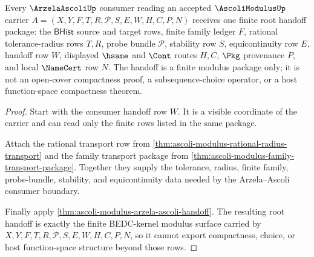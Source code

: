 \begin{theorem}
\label{thm:ascoli-modulus-arzela-root-handoff-package}
Every $\ArzelaAscoliUp$ consumer reading an accepted $\AscoliModulusUp$ carrier $A=(X,Y,F,T,R,\mathcal{P},S,E,W,H,C,P,N)$ receives one finite root handoff package: the $\mathsf{BHist}$ source and target rows, finite family ledger $F$, rational tolerance-radius rows $T,R$, probe bundle $\mathcal{P}$, stability row $S$, equicontinuity row $E$, handoff row $W$, displayed $\hsame$ and $\Cont$ routes $H,C$, $\Pkg$ provenance $P$, and local $\NameCert$ row $N$. The handoff is a finite modulus package only; it is not an open-cover compactness proof, a subsequence-choice operator, or a host function-space compactness theorem.
\end{theorem}
\begin{proof}
Start with the consumer handoff row $W$. It is a visible coordinate of the carrier and can read only the finite rows listed in the same package.

Attach the rational transport row from \autoref{thm:ascoli-modulus-rational-radius-transport} and the family transport package from \autoref{thm:ascoli-modulus-family-transport-package}. Together they supply the tolerance, radius, finite family, probe-bundle, stability, and equicontinuity data needed by the Arzela--Ascoli consumer boundary.

Finally apply \autoref{thm:ascoli-modulus-arzela-ascoli-handoff}. The resulting root handoff is exactly the finite BEDC-kernel modulus surface carried by $X,Y,F,T,R,\mathcal{P},S,E,W,H,C,P,N$, so it cannot export compactness, choice, or host function-space structure beyond those rows.
\end{proof}

